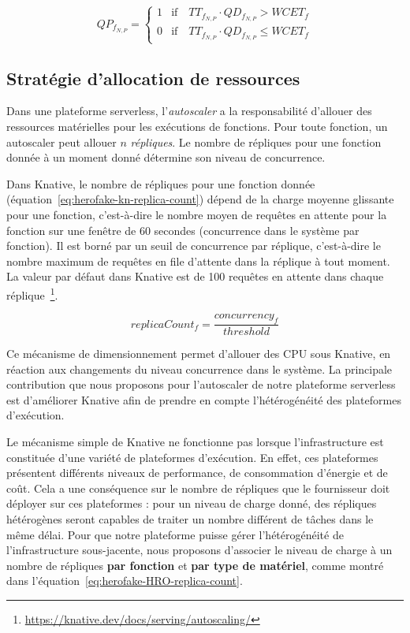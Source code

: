 \begin{equation}
    QP_{f_{N, P}} =
    \begin{cases}
    1 & \text{if} \quad TT_{f_{N, P}} \cdot QD_{f_{N, P}} > WCET_{f} \\
    0 & \text{if} \quad TT_{f_{N, P}} \cdot QD_{f_{N, P}} \leq WCET_{f}
    \end{cases}
\label{eq:herofake-task-penalty}
\end{equation}

\subsection{Stratégie d'allocation de ressources} \label{section:herofake-autoscaling-strategy}

Dans une plateforme serverless, l'\textit{autoscaler} a la responsabilité d'allouer des ressources matérielles pour les exécutions de fonctions. Pour toute fonction, un autoscaler peut allouer $n$ \textit{répliques}. Le nombre de répliques pour une fonction donnée à un moment donné détermine son niveau de concurrence.

Dans Knative, le nombre de répliques pour une fonction donnée (équation~\ref{eq:herofake-kn-replica-count}) dépend de la charge moyenne glissante pour une fonction, c'est-à-dire le nombre moyen de requêtes en attente pour la fonction sur une fenêtre de 60 secondes (concurrence dans le système par fonction). Il est borné par un seuil de concurrence par réplique, c'est-à-dire le nombre maximum de requêtes en file d'attente dans la réplique à tout moment. La valeur par défaut dans Knative est de 100 requêtes en attente dans chaque réplique~\footnote{\href{https://knative.dev/docs/serving/autoscaling/}{https://knative.dev/docs/serving/autoscaling/}}.

\begin{equation}
    replicaCount_{f} = \frac{concurrency_{f}}{threshold}
\label{eq:herofake-kn-replica-count}
\end{equation}

Ce mécanisme de dimensionnement permet d'allouer des \gls{CPU} sous Knative, en réaction aux changements du niveau concurrence dans le système. La principale contribution que nous proposons pour l'autoscaler de notre plateforme serverless est d'améliorer Knative afin de prendre en compte l'hétérogénéité des plateformes d'exécution.

Le mécanisme simple de Knative ne fonctionne pas lorsque l'infrastructure est constituée d'une variété de plateformes d'exécution. En effet, ces plateformes présentent différents niveaux de performance, de consommation d'énergie et de coût. Cela a une conséquence sur le nombre de répliques que le fournisseur doit déployer sur ces plateformes : pour un niveau de charge donné, des répliques hétérogènes seront capables de traiter un nombre différent de tâches dans le même délai. Pour que notre plateforme puisse gérer l'hétérogénéité de l'infrastructure sous-jacente, nous proposons d'associer le niveau de charge à un nombre de répliques \textbf{par fonction} et \textbf{par type de matériel}, comme montré dans l'équation~\ref{eq:herofake-HRO-replica-count}.

